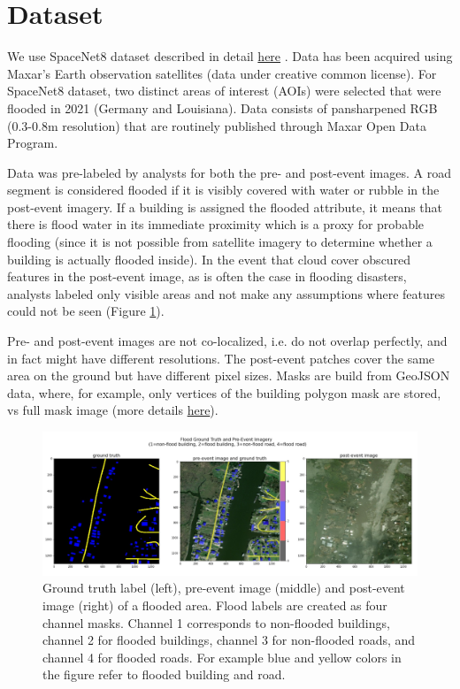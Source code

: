 \documentclass[10pt,twocolumn,letterpaper]{article}
\begin{document}
\section{Dataset}

We use SpaceNet8 dataset described in detail \href{https://openaccess.thecvf.com/content/CVPR2022W/EarthVision/papers/Hansch_SpaceNet_8_-_The_Detection_of_Flooded_Roads_and_Buildings_CVPRW_2022_paper.pdf}{here} \cite{spacenet8}. Data has been acquired using Maxar’s Earth observation satellites (data under creative common license). For SpaceNet8 dataset, two distinct areas of interest (AOIs) were selected that were flooded in 2021 (Germany and Louisiana). Data consists of pansharpened RGB (0.3-0.8m resolution) that are routinely published through Maxar Open Data Program.

Data was pre-labeled by analysts for both the pre- and post-event images. A road segment is considered flooded if it is visibly covered with water or rubble in the post-event imagery. If a building is assigned the flooded attribute, it means that there is flood water in its immediate proximity which is a proxy for probable flooding (since it is not possible from satellite imagery to determine whether a building is actually flooded inside). In the event that cloud cover obscured features in the post-event image, as is often the case in flooding disasters, analysts labeled only visible areas and not make any assumptions where features could not be seen (Figure \ref{fig:dataset1}).

Pre- and post-event images are not co-localized, i.e. do not overlap perfectly, and in fact might have different resolutions. The post-event
patches cover the same area on the ground but have different pixel sizes. Masks are build from GeoJSON data, where, for example, only vertices of the building polygon mask are stored, vs full mask image (more details \href{https://medium.com/the-downlinq/getting-started-with-spacenet-data-827fd2ec9f53}{here}).

\begin{figure}[t]
  \centering
   \includegraphics[width=1.0\linewidth]{figures/dataset1.jpg}
   \caption{Ground truth label (left), pre-event image (middle) and post-event image (right) of a flooded area. Flood labels
are created as four channel masks. Channel 1 corresponds
to non-flooded buildings, channel 2 for flooded buildings,
channel 3 for non-flooded roads, and channel 4 for flooded
roads. For example blue and yellow colors in the figure refer to flooded building and road.}
   \label{fig:dataset1}
\end{figure}
\end{document}
